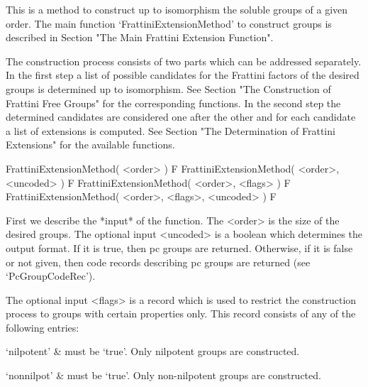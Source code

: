 


This is a method to construct up to isomorphism the soluble groups 
of a given order. The main function `FrattiniExtensionMethod' to 
construct groups is described in Section "The Main Frattini Extension 
Function". 

The construction process consists of two parts which can be addressed
separately. In the first step a list of possible candidates for the
Frattini factors of the desired groups is determined up to isomorphism.
See Section "The Construction of Frattini Free Groups" for the 
corresponding functions. In the second step the determined candidates
are considered one after the other and for each candidate a list of
extensions is computed. See Section "The Determination of Frattini 
Extensions" for the available functions.



\> FrattiniExtensionMethod( <order> ) F
\> FrattiniExtensionMethod( <order>, <uncoded> ) F
\> FrattiniExtensionMethod( <order>, <flags> ) F
\> FrattiniExtensionMethod( <order>, <flags>, <uncoded> ) F

First we describe the *input* of the function. The <order> is the
size of the desired groups. The optional input <uncoded> is a 
boolean which determines the output format. If it is true, then 
pc groups are returned. Otherwise, if it is false or not given,
then code records describing pc groups are returned (see
`PcGroupCodeRec').

The optional input <flags> is a record which is used to restrict 
the construction process to groups with certain properties only. 
This record consists of any of the following
entries:

\beginitems
 `nilpotent' & 
      must be `true'. Only nilpotent groups are constructed.

 `nonnilpot' & 
      must be `true'. Only non-nilpotent groups are constructed.

